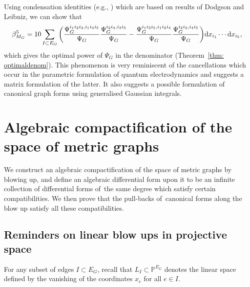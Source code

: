 \documentclass[pdftex]{sigma}%
\numberwithin{equation}{section}
\newcommand{\Pro}{\mathbb P}
\newcommand{\0}{\color{blue}{\mathsf{0}}}
\begin{document}
\begin{rem}
Using condensation identities (e.g., \cite[Sections~2.4--2.5]{PeriodsFeynman}) which are based on results of Dodgson and Leibniz, we can show that
\begin{gather*}
\beta^5_{M_G} = 10 \sum_{I \subset E_G} \bigg(\frac{\Psi_G^{i_1 i_2 i_3 , i_1i_4i_5}}{\Psi_G}
\frac{\Psi_G^{i_2 i_4, i_3i_5}}{\Psi_G}- \frac{\Psi_G^{i_1 i_3 i_5 , i_1i_2i_4}}{\Psi_G} \frac{\Psi_G^{i_2 i_3, i_4i_5}}{\Psi_G} \bigg) {\rm d}x_{i_1} \cdots {\rm d}x_{i_5},
\end{gather*}
which gives the optimal power of $\Psi_G$ in the denominator (Theorem~\ref{thm: optimaldenom}).
This phenomenon is very reminiscent of the cancellations which occur in the parametric formulation of quantum electrodynamics \cite{Golz} and suggests a matrix formulation of the latter. It also suggests a possible formulation of canonical graph forms using generalised Gaussian integrals.
\end{rem}

\section{Algebraic compactification of the space of metric graphs}
We construct an algebraic compactification of the space of metric graphs by blowing up, and define an algebraic differential form upon it to be an infinite collection of differential forms of~the same degree which satisfy certain compatibilities.
We then prove that the pull-backs of~canonical forms along the blow up satisfy all these compatibilities.

\subsection{Reminders on linear blow ups in projective space}
For any subset of edges $I \subset E_G$, recall that $L_I \subset \Pro^{E_G}$ denotes the linear space defined by the vanishing of the coordinates $x_e$ for all $e\in I$.
\end{document}
